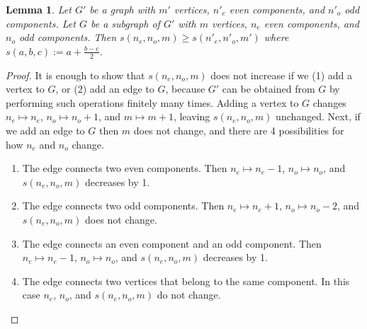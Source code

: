 \documentclass[english]{article}
\newtheorem{lemma}{Lemma}
\begin{document}
\begin{lemma}\label{lemma:subgraph}
  Let $G'$ be a graph with $m'$ vertices, $n'_e$ even components, and $n'_o$ odd components.
  Let $G$ be a subgraph of $G'$ with $m$ vertices, $n_e$ even components, and $n_o$ odd components.
  Then $s(n_e, n_o, m) \ge s(n'_e, n'_o, m')$ where $s(a,b,c) := a + \frac{b-c}{2}$.
\end{lemma}
\begin{proof}
  It is enough to show that $s(n_e,n_o,m)$ does not increase if we (1) add a vertex to $G$, or (2) add an edge to $G$, because $G'$ can be obtained from $G$ by performing such operations finitely many times.
  Adding a vertex to $G$ changes $n_e \mapsto n_e$, $n_o \mapsto n_o+1$, and $m \mapsto m+1$, leaving $s(n_e,n_o,m)$ unchanged.
  Next, if we add an edge to $G$ then $m$ does not change, and there are 4 possibilities for how $n_e$ and $n_o$ change.
  \begin{enumerate}
  \item The edge connects two even components.
    Then $n_e \mapsto n_e-1$, $n_o \mapsto n_o$, and $s(n_e,n_o,m)$ decreases by 1.
  \item The edge connects two odd components.
    Then $n_e \mapsto n_e + 1$, $n_o \mapsto n_o - 2$, and $s(n_e,n_o,m)$ does not change.
  \item The edge connects an even component and an odd component.
    Then $n_e \mapsto n_e - 1$, $n_o \mapsto n_o$, and $s(n_e,n_o,m)$ decreases by 1.
  \item The edge connects two vertices that belong to the same component.
    In this case $n_e$, $n_o$, and $s(n_e,n_o,m)$ do not change.
  \end{enumerate}
\end{proof}
\end{document}
